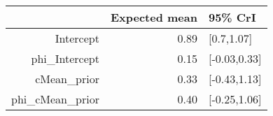 \begin{tabular}{rrl}
  \hline
 & Expected mean & 95\% CrI \\ 
  \hline
Intercept & 0.89 & [0.7,1.07] \\ 
  phi\_Intercept & 0.15 & [-0.03,0.33] \\ 
  cMean\_prior & 0.33 & [-0.43,1.13] \\ 
  phi\_cMean\_prior & 0.40 & [-0.25,1.06] \\ 
   \hline
\end{tabular}

